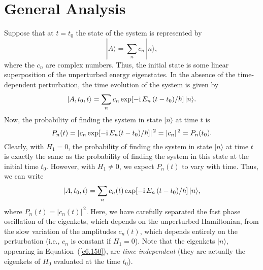\section{General Analysis}
Suppose that at $t=t_0$ the state of the system is represented by
\begin{equation}
|A\rangle = \sum_n c_n\, |n\rangle,
\end{equation}
where the $c_n$ are complex numbers. Thus, the initial state is some
linear superposition of the unperturbed 
energy eigenstates. In the absence of the
time-dependent perturbation, the time evolution of the system is
given by
\begin{equation}
|A, t_0, t\rangle = \sum_n c_n \exp[-{\rm i}\,E_n \,(t-t_0)/\hbar]\,|n\rangle.
\end{equation}
Now, the probability of finding the system in state $|n\rangle$ at time
$t$ is 
\begin{equation}
P_n(t) = |c_n \exp[-{\rm i}\,E_n (t-t_0)/\hbar]|^{\,2} = |c_n|^{\,2} = P_n(t_0).
\end{equation}
Clearly, with $H_1= 0$, the probability of finding the system in
state $|n\rangle$ at time $t$ is exactly the same as the probability
of finding the system in this state at the initial time $t_0$. However,
with $H_1\neq 0$, we expect $P_n(t)$ to vary with time. Thus, we can
write
\begin{equation}\label{e6.150}
|A, t_0, t\rangle = \sum_n c_n(t) \exp[-{\rm i}\,E_n\,(t-t_0)/\hbar]\,|n\rangle,
\end{equation}
where $P_n(t) = |c_n(t)|^{\,2}$. Here, we have carefully separated the fast 
phase oscillation of the eigenkets, which depends on the unperturbed
Hamiltonian, from the slow variation of the amplitudes $c_n(t)$, which
depends entirely on the perturbation ({\rm i.e.}, $c_n$ is constant if $H_1=0$).
Note that the eigenkets $|n\rangle$, appearing in Equation~(\ref{e6.150}), are {\em time-independent}\/ 
(they are actually the eigenkets of $H_0$ evaluated at the time $t_0$).

